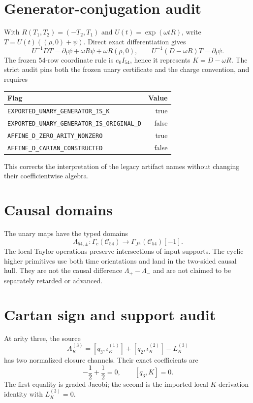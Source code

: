 \documentclass[11pt]{article}
\begin{document}
\section{Generator-conjugation audit}

With $R(T_1,T_2)=(-T_2,T_1)$ and
$U(t)=\exp(\omega tR)$, write
$T=U(t)((\rho,0)+\psi)$.  Direct exact differentiation gives
\[
 U^{-1}DT=\partial_t\psi+\omega R\psi+\omega R(\rho,0),
 \qquad
 U^{-1}(D-\omega R)T=\partial_t\psi.
\]
The frozen $54$-row coordinate rule is $e_0I_{54}$, hence it represents
$K=D-\omega R$.  The strict audit pins both the frozen unary certificate and
the charge convention, and requires
\begin{center}
\begin{tabular}{lr}
\toprule
Flag & Value\\
\midrule
\texttt{EXPORTED\_UNARY\_GENERATOR\_IS\_K} & true\\
\texttt{EXPORTED\_UNARY\_GENERATOR\_IS\_ORIGINAL\_D} & false\\
\texttt{AFFINE\_D\_ZERO\_ARITY\_NONZERO} & true\\
\texttt{AFFINE\_D\_CARTAN\_CONSTRUCTED} & false\\
\bottomrule
\end{tabular}
\end{center}
This corrects the interpretation of the legacy artifact names without
changing their coefficientwise algebra.

\section{Causal domains}

The unary maps have the typed domains
\[
 \Lambda_{54,\pm}:\Gamma_c(\mathcal C_{54})
 \longrightarrow\Gamma_{J^\pm}(\mathcal C_{54})[-1].
\]
The local Taylor operations preserve intersections of input supports.  The
cyclic higher primitives use both time orientations and land in the
two-sided causal hull.  They are not the causal difference
$\Lambda_+-\Lambda_-$ and are not claimed to be separately retarded or
advanced.

\section{Cartan sign and support audit}

At arity three, the source
\[
 A_K^{(3)}=[q_3,\iota_K^{(1)}]+[q_2,\iota_K^{(2)}]-L_K^{(3)}
\]
has two normalized closure channels.  Their exact coefficients are
\[
 -\frac12+\frac12=0,
 \qquad [q_3,K]=0.
\]
The first equality is graded Jacobi; the second is the imported local
$K$-derivation identity with $L_K^{(3)}=0$.
\end{document}
